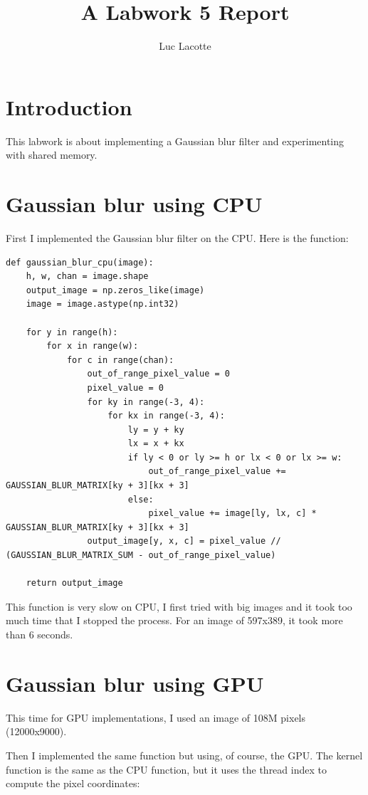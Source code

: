\documentclass{report}
\title{A Labwork 5 Report}
\author{Luc Lacotte}
\date{}
\begin{document}
\maketitle

\section{Introduction}
This labwork is about implementing a Gaussian blur filter and experimenting with shared memory.

\section{Gaussian blur using CPU}
First I implemented the Gaussian blur filter on the CPU.
Here is the function:

\begin{lstlisting}
def gaussian_blur_cpu(image):
    h, w, chan = image.shape
    output_image = np.zeros_like(image)
    image = image.astype(np.int32)

    for y in range(h):
        for x in range(w):
            for c in range(chan):
                out_of_range_pixel_value = 0
                pixel_value = 0
                for ky in range(-3, 4):
                    for kx in range(-3, 4):
                        ly = y + ky
                        lx = x + kx
                        if ly < 0 or ly >= h or lx < 0 or lx >= w:
                            out_of_range_pixel_value += GAUSSIAN_BLUR_MATRIX[ky + 3][kx + 3]
                        else:
                            pixel_value += image[ly, lx, c] * GAUSSIAN_BLUR_MATRIX[ky + 3][kx + 3]
                output_image[y, x, c] = pixel_value // (GAUSSIAN_BLUR_MATRIX_SUM - out_of_range_pixel_value)

    return output_image
\end{lstlisting}

This function is very slow on CPU, I first tried with big images and it took too much time that I stopped the process.
For an image of 597x389, it took more than 6 seconds.

\section{Gaussian blur using GPU}
This time for GPU implementations, I used an image of 108M pixels (12000x9000).

Then I implemented the same function but using, of course, the GPU.
The kernel function is the same as the CPU function, but it uses the thread index to compute the pixel coordinates:
\end{document}
